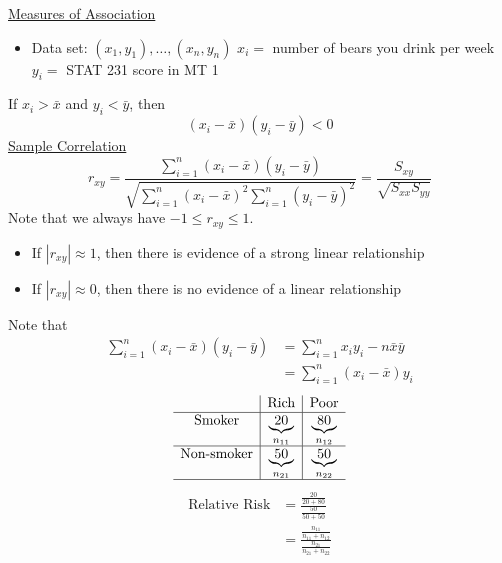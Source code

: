 \underline{Measures of Association}
\begin{itemize}
    \item Data set: $ (x_1,y_1),\ldots ,(x_n,y_n) $
          \subitem $ x_i= $ number of bears you drink per week
          \subitem $ y_i= $ STAT 231 score in MT 1
\end{itemize}
If $ x_i>\bar{x} $ and $ y_i<\bar{y} $, then
\[ (x_i-\bar{x})(y_i-\bar{y})<0 \]
\underline{Sample Correlation}
\[ r_{xy}=\frac{\sum\limits_{i=1}^{n} (x_i-\bar{x})(y_i-\bar{y})}{
        \sqrt{\sum\limits_{i=1}^{n} (x_i-\bar{x})^2\sum\limits_{i=1}^{n}
            (y_i-\bar{y})^2}
    }=\frac{S_{xy}}{\sqrt{S_{xx}S_{yy}}}  \]
Note that we always have $ -1\leqslant r_{xy}\leqslant 1 $.
\begin{itemize}
    \item If $ |r_{xy}|\approx 1 $, then there is evidence of a strong linear relationship
    \item If $ |r_{xy}|\approx 0 $, then there is no evidence of a linear relationship
\end{itemize}
Note that
\begin{align*}
    \sum\limits_{i=1}^{n} (x_i-\bar{x})(y_i-\bar{y})
     & =\sum\limits_{i=1}^{n} x_iy_i-n\bar{x}\bar{y} \\
     & =\sum\limits_{i=1}^{n} (x_i-\bar{x})y_i
\end{align*}
\[ \begin{array}{c|c|c}
                          & \text{Rich}              & \text{Poor}              \\
        \hline
        \text{Smoker}     & \underbrace{20}_{n_{11}} & \underbrace{80}_{n_{12}} \\
        \hline
        \text{Non-smoker} & \underbrace{50}_{n_{21}} & \underbrace{50}_{n_{22}} \\
        \hline
    \end{array} \]
\begin{align*}
    \text{Relative Risk}
     & =\frac{\frac{20}{20+80}}{\frac{50}{50+50}}                         \\
     & =\frac{\frac{n_{11}}{n_{11}+n_{12}}}{\frac{n_{21}}{n_{21}+n_{22}}}
\end{align*}
